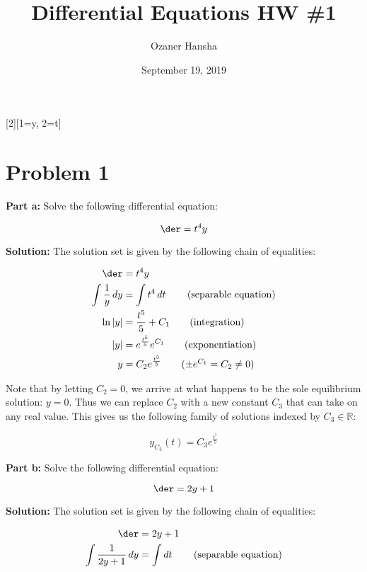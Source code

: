 \documentclass{article}
\begin{document}
\title{Differential Equations HW \#1}
\author{Ozaner Hansha}
\date{September 19, 2019}
\maketitle

[2][1=y, 2=t]{}

\section*{Problem 1}
\noindent\textbf{Part a:} Solve the following differential equation:

\begin{equation*}
    \der=t^4y
\end{equation*}
\smallskip

\noindent\textbf{Solution:} The solution set is given by the following chain of equalities:

\begin{align*}
    \der&=t^4y\\
    \int \frac{1}{y}\mathop{dy}&=\int t^4\mathop{dt}\tag{separable equation}\\
    \ln{|y|}&=\frac{t^5}{5}+C_1\tag{integration}\\
    |y|&=e^{\frac{t^5}{5}}e^{C_1}\tag{exponentiation}\\
    y&=C_2e^{\frac{t^5}{5}}\tag{$\pm e^{C_1}=C_2\not=0$}
\end{align*}

Note that by letting $C_2=0$, we arrive at what happens to be the sole equilibrium solution: $y=0$. Thus we can replace $C_2$ with a new constant $C_3$ that can take on any real value. This gives us the following family of solutions indexed by $C_3\in\mathbb R$:

\begin{equation*}
    y_{C_3}(t)=C_3e^{\frac{t^5}{5}}
\end{equation*}
\smallskip

\noindent\textbf{Part b:} Solve the following differential equation:

\begin{equation*}
    \der=2y+1
\end{equation*}
\smallskip

\noindent\textbf{Solution:} The solution set is given by the following chain of equalities:

\begin{align*}
    \der&=2y+1\\
    \int \frac{1}{2y+1}\mathop{dy}&=\int\mathop{dt}\tag{separable equation}
\end{align*}
\pagebreak
\end{document}
